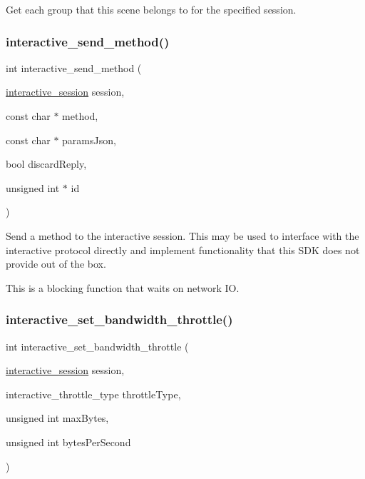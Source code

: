 Get each group that this scene belongs to for the specified session. 

\mbox{\label{group___interactivity_gaf2aa764d771d2ec5f611023324c30214}} 
\subsubsection{\texorpdfstring{interactive\+\_\+send\+\_\+method()}{interactive\_send\_method()}}
{\footnotesize\ttfamily int interactive\+\_\+send\+\_\+method (\begin{DoxyParamCaption}\item[{\mbox{\hyperlink{group___interactivity_ga6d8819d38b8dc8994a2299cf22a65a31}{interactive\+\_\+session}}}]{session,  }\item[{const char $\ast$}]{method,  }\item[{const char $\ast$}]{params\+Json,  }\item[{bool}]{discard\+Reply,  }\item[{unsigned int $\ast$}]{id }\end{DoxyParamCaption})}



Send a method to the interactive session. This may be used to interface with the interactive protocol directly and implement functionality that this S\+DK does not provide out of the box. 

This is a blocking function that waits on network IO. \mbox{\label{group___interactivity_gabbc2397a492c987161be8fd99fc7421b}} 
\subsubsection{\texorpdfstring{interactive\+\_\+set\+\_\+bandwidth\+\_\+throttle()}{interactive\_set\_bandwidth\_throttle()}}
{\footnotesize\ttfamily int interactive\+\_\+set\+\_\+bandwidth\+\_\+throttle (\begin{DoxyParamCaption}\item[{\mbox{\hyperlink{group___interactivity_ga6d8819d38b8dc8994a2299cf22a65a31}{interactive\+\_\+session}}}]{session,  }\item[{interactive\+\_\+throttle\+\_\+type}]{throttle\+Type,  }\item[{unsigned int}]{max\+Bytes,  }\item[{unsigned int}]{bytes\+Per\+Second }\end{DoxyParamCaption})}



